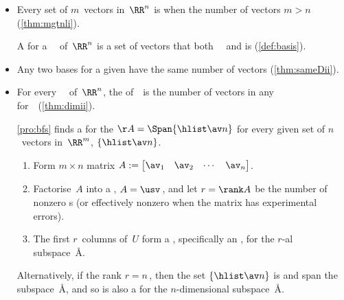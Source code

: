 \begin{itemize}
\itemhi For every \(n\times n\) matrix~\(A\), let \hlist\lambda m\ be distinct s of~\(A\) with corresponding s \hlist\vv m.
Then the set \(\{\hlist \vv m\}\) is  (\autoref{thm:indepev}).

\itemme Let \hlist\vv m\ be vectors in~\(\RR^n\),
and let the \(n\times m\) matrix \(V=\begin{bmatrix} \vv_1&\vv_2&\cdots&\vv_m \end{bmatrix}\).  
Then the set \(\{\hlist\vv m\}\) is  if and only if the  system \(V\cv=\ov\) has a nonzero solution~\cv\ (\autoref{thm:linhomo}).

\item Every  set of \(m\)~vectors in~\(\RR^n\) is  when the number of vectors \(m>n\) (\autoref{thm:mgtnli}).

\itemme A  for a ~\WW\ of~\(\RR^n\) is a set of  vectors that both ~\WW\ and is  (\autoref{def:basis}).

\item Any two bases for a given  have the same number of vectors (\autoref{thm:sameDii}).

\item For every ~\WW\ of~\(\RR^n\),  
the  of~\WW\ is the number of vectors in any  for~\WW\ (\autoref{thm:dimii}). 

\itemme \autoref{pro:bfs} finds a  for the  \(\AA=\Span\{\hlist\av n\}\) for every given set of $n$~vectors in~\(\RR^m\), $\{\hlist\av n\}$.
\begin{enumerate}
\item Form \(m\times n\) matrix $A:= \begin{bmatrix} \av_1 & \av_2& \cdots&\av_n \end{bmatrix}$. 
\item Factorise~\(A\) into a \svd, $A=\usv$\,, and let \(r=\rank A\) be the number of nonzero s (or effectively nonzero when the matrix has experimental errors).
\item The first \(r\)~columns of~\(U\) form a , specifically an , for the \(r\)-al subspace~\AA.
\end{enumerate}
Alternatively, if the rank \(r=n\)\,, then the set \(\{\hlist\av n\}\) is  and span the subspace~\AA, and so is also a  for the \(n\)-dimensional subspace~\AA.



\end{itemize}
